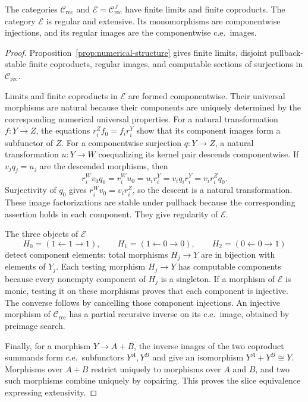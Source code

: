 \begin{proposition}\label{prop:fork-total}
The categories $\mathcal C_{\mathrm{rec}}$ and
$\mathcal E=\mathcal C_{\mathrm{rec}}^J$ have finite limits and
finite coproducts. The category $\mathcal E$ is regular and
extensive. Its monomorphisms are componentwise injections, and its
regular images are the componentwise c.e.\ images.
\end{proposition}
\begin{proof}
Proposition~\ref{prop:numerical-structure} gives finite limits,
disjoint pullback-stable finite coproducts, regular images, and
computable sections of surjections in $\mathcal C_{\mathrm{rec}}$.

Limits and finite coproducts in $\mathcal E$ are formed
componentwise. Their universal morphisms are natural because their
components are uniquely determined by the corresponding numerical
universal properties. For a natural transformation $f:Y\to Z$,
the equations $r_i^Zf_0=f_i r_i^Y$ show that its component images
form a subfunctor of $Z$.
For a componentwise surjection $q:Y\to Z$, a natural transformation
$u:Y\to W$ coequalizing its kernel pair descends componentwise.
If $v_jq_j=u_j$ are the descended morphisms, then
\[
 r_i^Wv_0q_0=r_i^Wu_0=u_i r_i^Y
 =v_iq_i r_i^Y=v_i r_i^Zq_0.
\]
Surjectivity of $q_0$ gives $r_i^Wv_0=v_i r_i^Z$, so the
descent is a natural transformation. These image factorizations are stable
under pullback because the corresponding assertion holds in
each component. They give regularity of $\mathcal E$.

The three objects of $\mathcal E$
\[
 H_0=(1\leftarrow1\to1),\qquad
 H_1=(1\leftarrow0\to0),\qquad
 H_2=(0\leftarrow0\to1)
\]
detect component elements: total morphisms $H_j\to Y$ are in bijection
with elements of $Y_j$. Each testing morphism $H_j\to Y$ has computable components because every
nonempty component of $H_j$ is a singleton.
If a morphism of $\mathcal E$ is monic,
testing it on these morphisms proves that each component is injective.
The converse follows by cancelling those component injections.
An injective morphism of $\mathcal C_{\mathrm{rec}}$ has a partial recursive inverse
on its c.e.\ image, obtained by preimage search.

Finally, for a morphism $Y\to A+B$, the inverse images of the two
coproduct summands form c.e.\ subfunctors $Y^A,Y^B$ and give an
isomorphism $Y^A+Y^B\cong Y$. Morphisms over $A+B$ restrict uniquely to morphisms
over $A$ and $B$, and two such morphisms combine uniquely by
copairing. This proves the slice equivalence expressing extensivity.
\end{proof}

